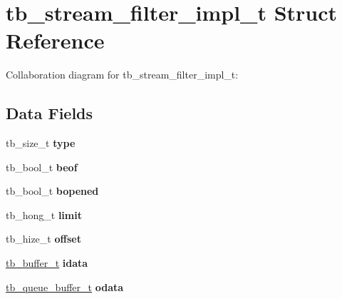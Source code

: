 \hypertarget{structtb__stream__filter__impl__t}{\section{tb\-\_\-stream\-\_\-filter\-\_\-impl\-\_\-t Struct Reference}
\label{structtb__stream__filter__impl__t}
}


Collaboration diagram for tb\-\_\-stream\-\_\-filter\-\_\-impl\-\_\-t\-:
\subsection*{Data Fields}
\begin{DoxyCompactItemize}
\item 
\hypertarget{structtb__stream__filter__impl__t_ad9781821fc44f4bbbf2c455566f743af}{tb\-\_\-size\-\_\-t {\bfseries type}}\label{structtb__stream__filter__impl__t_ad9781821fc44f4bbbf2c455566f743af}

\item 
\hypertarget{structtb__stream__filter__impl__t_ad88acd952eb2459ea4152e48ceb05949}{tb\-\_\-bool\-\_\-t {\bfseries beof}}\label{structtb__stream__filter__impl__t_ad88acd952eb2459ea4152e48ceb05949}

\item 
\hypertarget{structtb__stream__filter__impl__t_aaab43e4e600237b4116540ef8e82a39e}{tb\-\_\-bool\-\_\-t {\bfseries bopened}}\label{structtb__stream__filter__impl__t_aaab43e4e600237b4116540ef8e82a39e}

\item 
\hypertarget{structtb__stream__filter__impl__t_a3d291d06a7b0f66fa23f120d5d5794a2}{tb\-\_\-hong\-\_\-t {\bfseries limit}}\label{structtb__stream__filter__impl__t_a3d291d06a7b0f66fa23f120d5d5794a2}

\item 
\hypertarget{structtb__stream__filter__impl__t_a290921362183e7056983709fb4106357}{tb\-\_\-hize\-\_\-t {\bfseries offset}}\label{structtb__stream__filter__impl__t_a290921362183e7056983709fb4106357}

\item 
\hypertarget{structtb__stream__filter__impl__t_ae53198dd2045c68848cdee80b58edff4}{\hyperlink{structtb__buffer__t}{tb\-\_\-buffer\-\_\-t} {\bfseries idata}}\label{structtb__stream__filter__impl__t_ae53198dd2045c68848cdee80b58edff4}

\item 
\hypertarget{structtb__stream__filter__impl__t_a8564db4ad3cceebb8bc2e3bb96be5028}{\hyperlink{structtb__queue__buffer__t}{tb\-\_\-queue\-\_\-buffer\-\_\-t} {\bfseries odata}}\label{structtb__stream__filter__impl__t_a8564db4ad3cceebb8bc2e3bb96be5028}


\end{DoxyCompactItemize}
